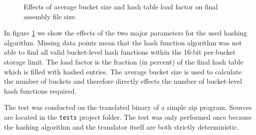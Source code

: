\documentclass[course=eragp]{aspdoc}
\begin{document}
\begin{figure}
    \begin{centering}
        \caption{Effects of average bucket size and hash table load factor on final assembly file size.}\label{hashing_figure}
    \end{centering}
\end{figure}

In figure \ref{hashing_figure} we show the effects of the two major parameters for the used hashing
algorithm. Missing data points mean that the hash function algorithm was not able to find all valid
bucket-level hash functions within the 16-bit per-bucket storage limit.  The load factor is the fraction (in percent) of the
final hash table which is filled with
hashed entries. The average bucket size is used to calculate the number of buckets and therefore
directly effects the number of bucket-level hash functions required. 

\par

The test was conducted on the translated binary of a simple zip program. Sources are located in the
\texttt{tests} project folder. The test was only performed once because the hashing algorithm and
the translator itself are both strictly deterministic.
\end{document}
